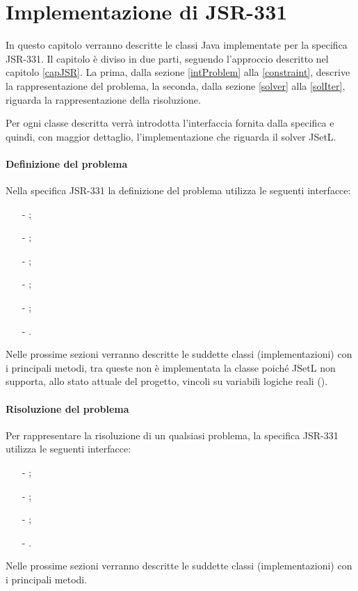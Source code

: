 
\chapter{Implementazione di JSR-331}\label{capImpl}
In questo capitolo verranno descritte le classi Java implementate per la
specifica JSR-331. Il capitolo è diviso in due parti, seguendo l'approccio
descritto nel capitolo \ref{capJSR}. La prima, dalla sezione \ref{intProblem}
alla \ref{constraint}, descrive la rappresentazione del problema, la seconda, 
dalla sezione \ref{solver} alla \ref{solIter}, riguarda la rappresentazione
della risoluzione.

Per ogni classe descritta verrà introdotta l'interfaccia fornita dalla 
specifica e quindi, con maggior dettaglio, l'implementazione che riguarda
il solver JSetL.

\subsubsection{Definizione del problema}
Nella specifica JSR-331 la definizione del problema utilizza le seguenti 
interfacce:
\begin{itemize}
\item[-];
\item[-];
\item[-];
\item[-];
\item[-];
\item[-].
\end{itemize}
Nelle prossime sezioni  
verranno descritte le suddette classi (implementazioni) 
con i principali metodi, tra
queste non è implementata la classe  poiché JSetL non supporta,
allo stato attuale del progetto, vincoli su variabili logiche reali 
().

\subsubsection{Risoluzione del problema}
Per rappresentare la risoluzione di un qualsiasi problema, la specifica JSR-331
utilizza le seguenti interfacce: 
\begin{itemize}
\item[-];
\item[-];
\item[-];
\item[-].
\end{itemize}
Nelle prossime sezioni verranno descritte le suddette classi (implementazioni)
con i principali metodi.

